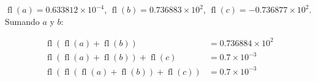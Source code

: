 \begin{frame}
\begin{solution}
\begin{enumerate}[b)]
			      \begin{math}
				      \operatorname{fl}\left(a\right)=
				      0.633812\times 10^{-4}
			      \end{math},
			      \begin{math}
				      \operatorname{fl}\left(b\right)=
				      0.736883\times 10^{2}
			      \end{math},
			      \begin{math}
				      \operatorname{fl}\left(c\right)=
				      -0.736877\times 10^{2}
			      \end{math}.
			      Sumando $a$ y $b$:

			      \begin{align*}
				      \operatorname{fl}\left(\operatorname{fl}\left(a\right)+\operatorname{fl}\left(b\right)\right)
				       & =
				      0.736884\times 10^{2} \\
				      \operatorname{fl}\left(\operatorname{fl}\left(a\right)+\operatorname{fl}\left(b\right)\right)+
				      \operatorname{fl}\left(c\right)
				       & =0.7\times 10^{-3} \\
				      \operatorname{fl}\left(\operatorname{fl}\left(\operatorname{fl}\left(a\right)+\operatorname{fl}\left(b\right)\right)+
				      \operatorname{fl}\left(c\right)\right)
				       & =
				      0.7\times 10^{-3}
			      \end{align*}
		\end{enumerate}
	\end{solution}
\end{frame}
